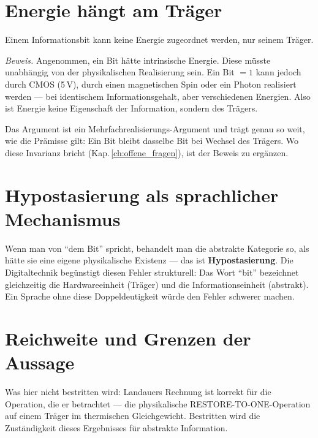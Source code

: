 \section{Energie hängt am Träger}

\begin{theorem}
Einem Informationsbit kann keine Energie zugeordnet werden, nur seinem Träger.
\end{theorem}

\textit{Beweis.} Angenommen, ein Bit hätte intrinsische Energie. Diese müsste
unabhängig von der physikalischen Realisierung sein. Ein Bit $= 1$ kann jedoch
durch CMOS (5\,V), durch einen magnetischen Spin oder ein Photon realisiert werden
--- bei identischem Informationsgehalt, aber verschiedenen Energien. Also ist
Energie keine Eigenschaft der Information, sondern des Trägers.

Das Argument ist ein Mehrfachrealisierungs-Argument und trägt genau so weit,
wie die Prämisse gilt: Ein Bit bleibt dasselbe Bit bei Wechsel des Trägers.
Wo diese Invarianz bricht (Kap.\,\ref{ch:offene_fragen}), ist der Beweis
zu ergänzen.

\section{Hypostasierung als sprachlicher Mechanismus}

Wenn man von \enquote{dem Bit} spricht, behandelt man die abstrakte Kategorie
so, als hätte sie eine eigene physikalische Existenz --- das ist
\textbf{Hypostasierung}. Die Digitaltechnik begünstigt diesen Fehler strukturell:
Das Wort \enquote{bit} bezeichnet gleichzeitig die Hardwareeinheit (Träger) und
die Informationseinheit (abstrakt). Ein Sprache ohne diese Doppeldeutigkeit würde
den Fehler schwerer machen.

\section{Reichweite und Grenzen der Aussage}

Was hier nicht bestritten wird: Landauers Rechnung ist korrekt für die
Operation, die er betrachtet --- die physikalische RESTORE-TO-ONE-Operation auf
einem Träger im thermischen Gleichgewicht. Bestritten wird die Zuständigkeit
dieses Ergebnisses für abstrakte Information.

